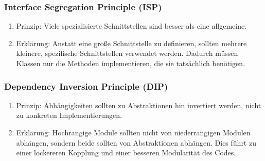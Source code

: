 \documentclass{article}
\begin{document}
\begin{enumerate}[label=\alph*)]
\begin{enumerate}[label=\arabic*)]
   \end{enumerate}
   \subsubsection*{Interface Segregation Principle (ISP)}
   \begin{enumerate}[label=\arabic*)]
   		\item Prinzip: Viele spezialisierte Schnittstellen sind besser als eine allgemeine.
		\item Erklärung: Anstatt eine große Schnittstelle zu definieren, sollten mehrere kleinere, spezifische Schnittstellen verwendet werden. Dadurch müssen Klassen nur die Methoden implementieren, die sie tatsächlich benötigen.
		
   \end{enumerate}
   \subsubsection*{Dependency Inversion Principle (DIP)}
   \begin{enumerate}[label=\arabic*)]
   		\item Prinzip: Abhängigkeiten sollten zu Abstraktionen hin invertiert werden, nicht zu konkreten Implementierungen.
		\item Erklärung: Hochrangige Module sollten nicht von niederrangigen Modulen abhängen, sondern beide sollten von Abstraktionen abhängen. Dies führt zu einer lockereren Kopplung und einer besseren Modularität des Codes.
		
   \end{enumerate}
\end{enumerate}


\newpage
{}
\end{document}
